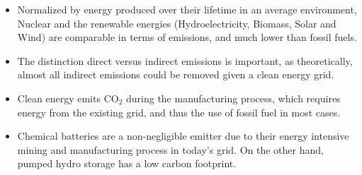 \begin{kaoboxgreen}[frametitle=Main Takeaways]

\begin{itemize}
\item Normalized by energy produced over their lifetime in an average environment, Nuclear and the renewable energies (Hydroelectricity, Biomass, Solar and Wind) are comparable in terms of emissions, and much lower than fossil fuels.
\item The distinction direct versus indirect emissions is important, as theoretically, almost all indirect emissions could be removed given a clean energy grid.
\item Clean energy emits $\mathrm{CO_2}$ during the manufacturing process, which requires energy from the existing grid, and thus the use of fossil fuel in most cases.
\item Chemical batteries are a non-negligible emitter due to their energy intensive mining and manufacturing process in today's grid. On the other hand, pumped hydro storage has a low carbon footprint.
\end{itemize}
  
\end{kaoboxgreen}


